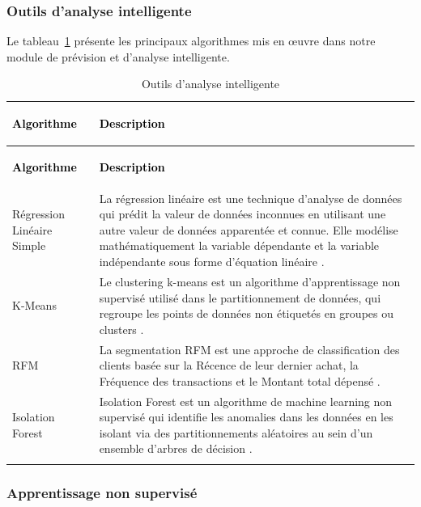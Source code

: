 \subsubsection{Outils d'analyse intelligente}

Le tableau~\ref{tab:algorithmes} présente les principaux algorithmes mis en œuvre
dans notre module de prévision et d'analyse intelligente.

\vspace{6pt}

\begin{longtable}{|>{\bfseries\raggedright\arraybackslash}p{3.5cm}|>{\raggedright\arraybackslash}p{9cm}|}
\hline
\rowcolor{blue!20}
\textcolor{black}{\textbf{Algorithme}} &
\textcolor{black}{\textbf{Description}} \\
\hline
\endfirsthead
\hline
\rowcolor{blue!20}
\textcolor{black}{\textbf{Algorithme}} &
\textcolor{black}{\textbf{Description}} \\
\hline
\endhead
Régression Linéaire Simple &
La régression linéaire est une technique d'analyse de données qui prédit la valeur
de données inconnues en utilisant une autre valeur de données apparentée et connue.
Elle modélise mathématiquement la variable dépendante et la variable indépendante
sous forme d'équation linéaire \cite{aws_regression}. \\
\hline
K-Means &
Le clustering k-means est un algorithme d'apprentissage non supervisé utilisé dans
le partitionnement de données, qui regroupe les points de données non étiquetés
en groupes ou clusters \cite{ibm_kmeans}. \\
\hline
RFM &
La segmentation RFM est une approche de classification des clients basée sur la
Récence de leur dernier achat, la Fréquence des transactions et le Montant total
dépensé \cite{dinmo_rfm}. \\
\hline
Isolation Forest &
Isolation Forest est un algorithme de machine learning non supervisé qui identifie
les anomalies dans les données en les isolant via des partitionnements aléatoires
au sein d'un ensemble d'arbres de décision \cite{datacamp_iforest}. \\
\hline
\caption{Outils d'analyse intelligente}
\label{tab:algorithmes}
\end{longtable}

\subsubsection{Apprentissage non supervisé}

